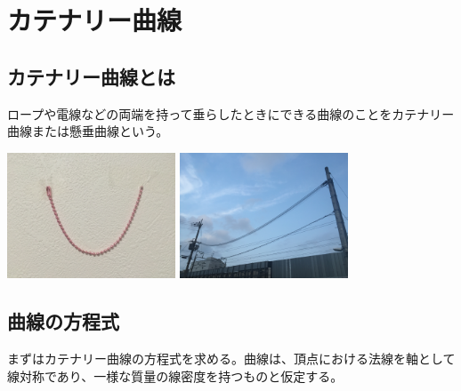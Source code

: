 \chapter{カテナリー曲線}
\section{カテナリー曲線とは}
ロープや電線などの両端を持って垂らしたときにできる曲線のことをカテナリー曲線または懸垂曲線という。\\
\begin{center}
\includegraphics[width = 5cm]{nakayama/image/chen.JPG}
\quad
\includegraphics[width = 5cm]{nakayama/image/densen.JPG}
\end{center}

\section{曲線の方程式}
まずはカテナリー曲線の方程式を求める。曲線は、頂点における法線を軸として線対称であり、一様な質量の線密度を持つものと仮定する。

